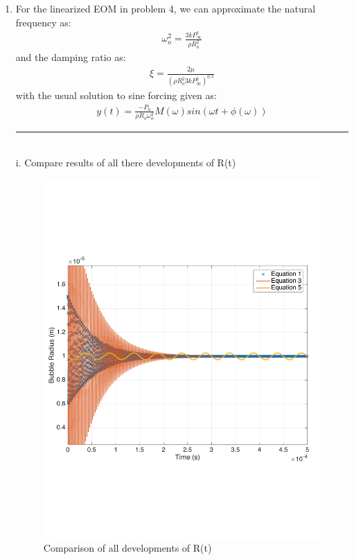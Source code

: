 \documentclass[12pt]{article}
\begin{document}
\begin{enumerate}
\newpage 
\item For the linearized EOM in problem 4, we can approximate the natural frequency as:
\begin{align*}
\omega_o^2 = \frac{3kP_\infty^e}{\rho R_o^2}
\end{align*}
and the damping ratio as:
\begin{align*}
\xi = \frac{2\mu}{(\rho R_o^2 3kP_\infty^2)^{0.5}}
\end{align*}
with the usual solution to sine forcing given as:
\begin{align*}
y(t) = \frac{-P_a}{\rho R_o \omega_o^2} M(\omega) sin(\omega t + \phi(\omega))
\end{align*}
\noindent\rule{14cm}{0.4pt}\\
i. Compare results of all there developments of R(t)
\begin{figure}[h]
\includegraphics[scale = 0.5]{Compare_All}
\centering
\caption{Comparison of all developments of R(t)}
\end{figure}


\end{enumerate}
\end{document}
